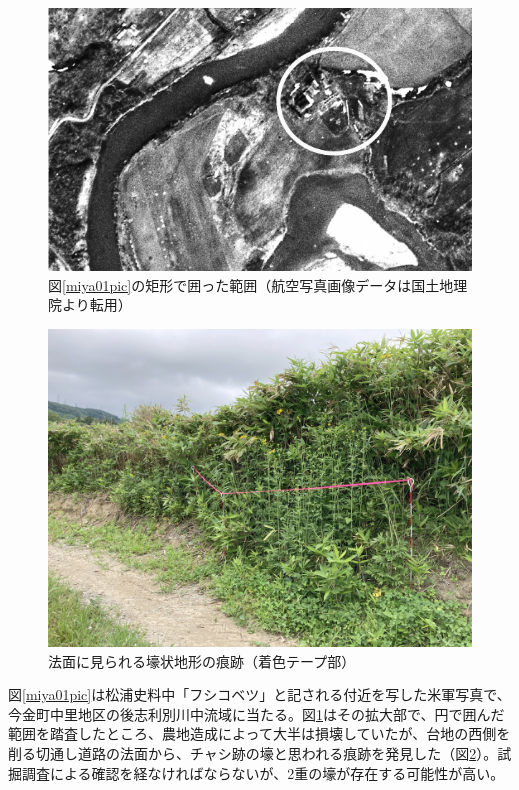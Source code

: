 \documentclass[a4j,11pt,twocolumn,openany]{jsbook}
\begin{document}
\begin{figure}[ht]
	\centering
	\includegraphics[width=\linewidth]{fig/05_Miyamoto/pic02.pdf}
	\caption{
		図\ref{miya01pic}の矩形で囲った範囲（航空写真画像データは国土地理院より転用）}
	\label{miya02pic}
	\vspace{-\baselineskip}
\end{figure}

\begin{figure}[ht]
	\centering
	\includegraphics[width=\linewidth]{fig/05_Miyamoto/pic03.jpg}
	\caption{法面に見られる壕状地形の痕跡（着色テープ部）}
	\label{miya03pic}
	\vspace{-\baselineskip}
\end{figure}

図\ref{miya01pic}は松浦史料中「フシコベツ」と記される付近を写した米軍写真で、今金町中里地区の後志利別川中流域に当たる。図\ref{miya02pic}はその拡大部で、円で囲んだ範囲を踏査したところ、農地造成によって大半は損壊していたが、台地の西側を削る切通し道路の法面から、チャシ跡の壕と思われる痕跡を発見した（図\ref{miya03pic}）。試掘調査による確認を経なければならないが、2重の壕が存在する可能性が高い。
\end{document}
